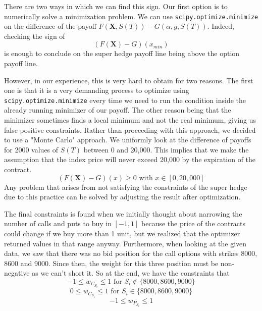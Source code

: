 There are two ways in which we can find this sign. Our first option is to numerically solve a minimization problem. We can use \verb|scipy.optimize.minimize| on the difference of the payoff $F(\mathbf{X}, S(T)) - G(\alpha, g, S(T))$. Indeed, checking the sign of
$$(F(\mathbf{X})-G)(x_{min})$$
is enough to conclude on the super hedge payoff line being above the option payoff line.

However, in our experience, this is very hard to obtain for two reasons. The first one is that it is a very demanding process to optimize using \verb|scipy.optimize.minimize| every time we need to run the condition inside the already running minimizer of our payoff. The other reason being that the minimizer sometimes finds a local minimum and not the real minimum, giving us false positive constraints. Rather than proceeding with this approach, we decided to use a "Monte Carlo" approach. We uniformly look at the difference of payoffs for 2000 values of $S(T)$ between 0 and 20,000. This implies that we make the assumption that the index price will never exceed 20,000 by the expiration of the contract.
$$(F(\mathbf{X})-G)(x)\geq 0 \text{ with } x \in [0,20,000]$$
Any problem that arises from not satisfying the constraints of the super hedge due to this practice can be solved by adjusting the result after optimization.

The final constraints is found when we initially thought about narrowing the number of calls and puts to buy in $[-1,1]$ because the price of the contracts could change if we buy more than 1 unit, but we realized that the optimizer returned values in that range anyway. Furthermore, when looking at the given data, we saw that there was no bid position for the call options with strikes 8000, 8600 and 9000. Since then, the weight for this three position must be non-negative as we can't short it. So at the end, we have the constraints that 
\[-1 \leq w_{C_{S_i}} \leq 1 \text{ for \(S_i \notin \{8000, 8600, 9000\}\)}\]
\[0 \leq w_{C_{S_i}} \leq 1 \text{ for \(S_i \in \{8000, 8600, 9000\}\)} \]
\[-1 \leq w_{P_{S_i}} \leq 1\]

